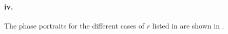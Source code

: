 \documentclass[a4paper,11pt]{article}
\begin{document}
\paragraph{iv.}\: The phase portraits for the different cases of $r$ listed in  are shown in .
\begin{figure}[H]
	\centering
\end{figure}
\end{document}
